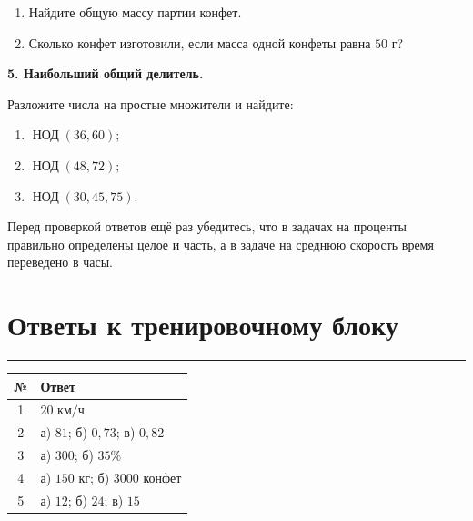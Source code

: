 \documentclass[a4paper,12pt]{article}
\newcommand{\sectionline}{%
    \vspace{0.2em}
    {\color{accent}\rule{\linewidth}{0.6pt}}
    \vspace{0.5em}
}
\begin{document}
\begin{enumerate}[label=\alph*),leftmargin=10mm]
    \item Найдите общую массу партии конфет.
    \item Сколько конфет изготовили, если масса одной конфеты равна \(50\) г?
\end{enumerate}

\vspace{8mm}

\textbf{5. Наибольший общий делитель.}

Разложите числа на простые множители и найдите:

\begin{enumerate}[label=\alph*),leftmargin=10mm]
    \item \(\operatorname{НОД}(36,60)\);
    \item \(\operatorname{НОД}(48,72)\);
    \item \(\operatorname{НОД}(30,45,75)\).
\end{enumerate}

\vfill

{\small\color{softgray}
Перед проверкой ответов ещё раз убедитесь, что в задачах на проценты правильно
определены целое и часть, а в задаче на среднюю скорость время переведено в часы.
}


\newpage

\section*{\color{darkaccent}Ответы к тренировочному блоку}
\sectionline

\renewcommand{\arraystretch}{1.5}

\begin{center}
\begin{tabularx}{\linewidth}{@{}cX@{}}
\toprule
\textbf{№} & \textbf{Ответ} \\
\midrule

1
&
\(\displaystyle 20\text{ км/ч}\)
\\

2
&
а) \(81\);
\qquad
б) \(0{,}73\);
\qquad
в) \(0{,}82\)
\\

3
&
а) \(300\);
\qquad
б) \(35\%\)
\\

4
&
а) \(150\text{ кг}\);
\qquad
б) \(3000\) конфет
\\

5
&
а) \(12\);
\qquad
б) \(24\);
\qquad
в) \(15\)
\\

\bottomrule
\end{tabularx}
\end{center}
\end{document}
